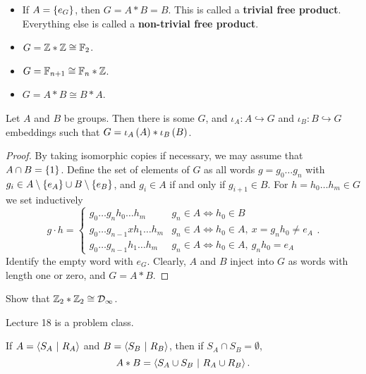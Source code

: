 \begin{remark}
\hfill
\begin{itemize}
\item If $ A = \cbr{e_G} $, then $ G = A * B = B $. This is called a \textbf{trivial free product}. Everything else is called a \textbf{non-trivial free product}.
\item $ G = \mathbb{Z} * \mathbb{Z} \cong \mathbb{F}_2 $.
\item $ G = \mathbb{F}_{n + 1} \cong \mathbb{F}_n * \mathbb{Z} $.
\item $ G = A * B \cong B * A $.
\end{itemize}
\end{remark}

\begin{lemma}
Let $ A $ and $ B $ be groups. Then there is some $ G $, and $ \iota_A : A \hookrightarrow G $ and $ \iota_B : B \hookrightarrow G $ embeddings such that $ G = \iota_A\br{A} * \iota_B\br{B} $.
\end{lemma}

\begin{proof}
By taking isomorphic copies if necessary, we may assume that $ A \cap B = \cbr{1} $. Define the set of elements of $ G $ as all words $ g = g_0 \dots g_n $ with $ g_i \in A \setminus \cbr{e_A} \cup B \setminus \cbr{e_B} $, and $ g_i \in A $ if and only if $ g_{i + 1} \in B $. For $ h = h_0 \dots h_m \in G $ we set inductively
$$ g \cdot h =
\begin{cases}
g_0 \dots g_nh_0 \dots h_m & g_n \in A \iff h_0 \in B \\
g_0 \dots g_{n - 1}xh_1 \dots h_m & g_n \in A \iff h_0 \in A, \ x = g_nh_0 \ne e_A \\
g_0 \dots g_{n - 1}h_1 \dots h_m & g_n \in A \iff h_0 \in A, \ g_nh_0 = e_A
\end{cases}.
$$
Identify the empty word with $ e_G $. Clearly, $ A $ and $ B $ inject into $ G $ as words with length one or zero, and $ G = A * B $.
\end{proof}

\begin{exercise}
Show that $ \mathbb{Z}_2 * \mathbb{Z}_2 \cong \mathcal{D}_\infty $.
\end{exercise}


Lecture 18 is a problem class.

\pagebreak


\begin{proposition}
If $ A = \left\langle S_A \ \middle| \  R_A \right\rangle $ and $ B = \left\langle S_B \ \middle| \  R_B \right\rangle $, then if $ S_A \cap S_B = \emptyset $,
$$ A * B = \left\langle S_A \cup S_B \ \middle| \  R_A \cup R_B \right\rangle. $$
\end{proposition}


